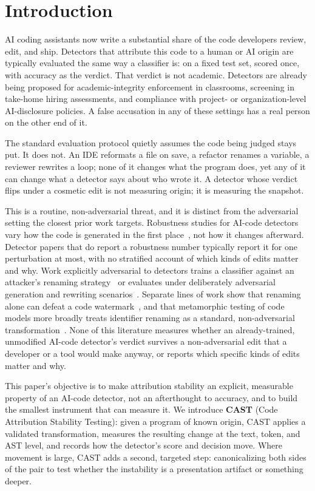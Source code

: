 \documentclass[sigconf,review,anonymous]{acmart}
\begin{document}
\section{Introduction}

AI coding assistants now write a substantial share of the code developers review, edit, and ship. Detectors that attribute this code to a human or AI origin are typically evaluated the same way a classifier is: on a fixed test set, scored once, with accuracy as the verdict. That verdict is not academic. Detectors are already being proposed for academic-integrity enforcement in classrooms, screening in take-home hiring assessments, and compliance with project- or organization-level AI-disclosure policies. A false accusation in any of these settings has a real person on the other end of it.

The standard evaluation protocol quietly assumes the code being judged stays put. It does not. An IDE reformats a file on save, a refactor renames a variable, a reviewer rewrites a loop; none of it changes what the program does, yet any of it can change what a detector says about who wrote it. A detector whose verdict flips under a cosmetic edit is not measuring origin; it is measuring the snapshot.

This is a routine, non-adversarial threat, and it is distinct from the adversarial setting the closest prior work targets. Robustness studies for AI-code detectors vary how the code is generated in the first place~\cite{hidinginplainsight}, not how it changes afterward. Detector papers that do report a robustness number typically report it for one perturbation at most, with no stratified account of which kinds of edits matter and why. Work explicitly adversarial to detectors trains a classifier against an attacker's renaming strategy~\cite{codegptsensorplus} or evaluates under deliberately adversarial generation and rewriting scenarios~\cite{droid}. Separate lines of work show that renaming alone can defeat a code watermark~\cite{codewatermark}, and that metamorphic testing of code models more broadly treats identifier renaming as a standard, non-adversarial transformation~\cite{metamorphicslr}. None of this literature measures whether an already-trained, unmodified AI-code detector's verdict survives a non-adversarial edit that a developer or a tool would make anyway, or reports which specific kinds of edits matter and why.

This paper's objective is to make attribution stability an explicit, measurable property of an AI-code detector, not an afterthought to accuracy, and to build the smallest instrument that can measure it. We introduce \textbf{CAST} (Code Attribution Stability Testing): given a program of known origin, CAST applies a validated transformation, measures the resulting change at the text, token, and AST level, and records how the detector's score and decision move. Where movement is large, CAST adds a second, targeted step: canonicalizing both sides of the pair to test whether the instability is a presentation artifact or something deeper.
\end{document}
